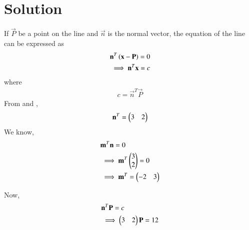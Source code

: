 \documentclass[journal,12pt,twocolumn]{IEEEtran}
\begin{document}
%
%
\section{Solution}
If $\vec P$ be a point on the line and $\vec n$ is the normal vector, the equation of the line can be expressed as 
\begin{align}
    & \mathbf n^T\left(\mathbf x - \mathbf P\right)=0\\
    & \label{eq2}\implies \mathbf n^T \mathbf x = c
\end{align}
where
\begin{align}
    c= \vec n^T \vec P
\end{align}
From \brak{\ref{eq1}} and \brak{\ref{eq2}}, 
\begin{align}
     \mathbf n^T = \begin{pmatrix}3 & 2\end{pmatrix}
\end{align}
We know,
\begin{align}
    &\mathbf m^T \mathbf n = 0\\
    &\implies \mathbf m^T \begin{pmatrix}3 \\2\end{pmatrix} = 0\\
    &\implies \mathbf m ^T = \begin{pmatrix}-2 & 3\end{pmatrix}
\end{align}

Now,
\begin{align}
    &\mathbf n^T \mathbf P = c \\
    &\implies \begin{pmatrix}3 & 2\end{pmatrix} \mathbf P= 12
\end{align}
\end{document}
